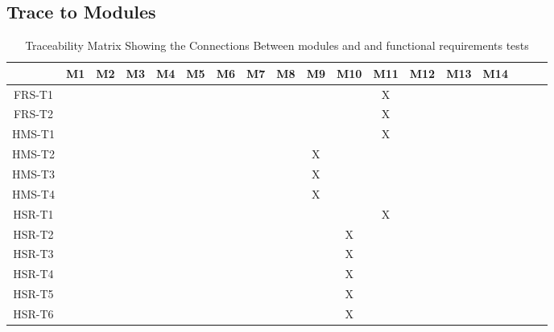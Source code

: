 \documentclass[12pt, oneside, openany, titlepage]{article}
\begin{document}
\begin{landscape}
\section{Trace to Modules}
\begin{table}[h!]
\centering
\begin{tabular}{|c|c|c|c|c|c|c|c|c|c|c|c|c|c|c|c|c|c|}
\hline
	& M1 & M2 & M3 & M4 & M5 & M6 & M7 & M8 & M9 & M10 & M11 & M12 & M13& M14\\
\hline
FRS-T1        & & & & & & & & & & & X& & & \\ \hline
FRS-T2        & & & & & & & & & & & X& & & \\ \hline
HMS-T1        & & & & & & & & & & & X& & & \\ \hline
HMS-T2        & & & & & & & & & X& & & & & \\ \hline
HMS-T3        & & & & & & & & & X& & & & & \\ \hline
HMS-T4        & & & & & & & & & X& & & & & \\ \hline
HSR-T1        & & & & & & & & & & & X& & & \\ \hline
HSR-T2        & & & & & & & & & & X& & & & \\ \hline
HSR-T3        & & & & & & & & & & X& & & & \\ \hline
HSR-T4        & & & & & & & & & & X& & & & \\ \hline
HSR-T5        & & & & & & & & & & X& & & & \\ \hline
HSR-T6        & & & & & & & & & & X& & & & \\ \hline
\end{tabular}
\caption{Traceability Matrix Showing the Connections Between modules and  and functional requirements tests}
\label{Table:A_trace}
\end{table}
\end{landscape}
\end{document}
